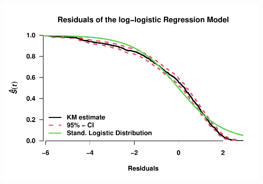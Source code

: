 \documentclass[
]{article}
\begin{document}
\includegraphics{practical_files/figure-latex/unnamed-chunk-13-1.pdf}
\end{document}
